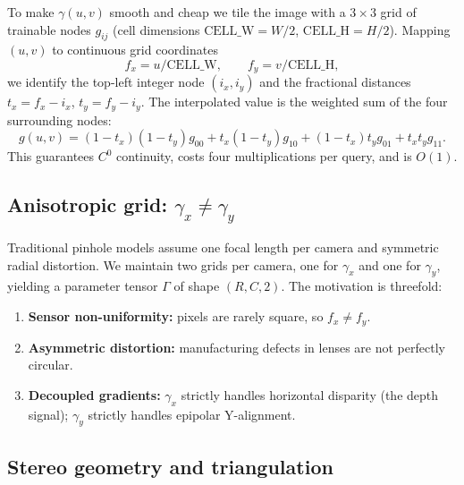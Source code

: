 \documentclass[11pt]{article}
\begin{document}
To make $\gamma(u, v)$ smooth and cheap we tile the image with a $3 \times 3$ grid of
trainable nodes $g_{ij}$ (cell dimensions $\text{CELL\_W} = W/2$, $\text{CELL\_H} = H/2$).
Mapping $(u, v)$ to continuous grid coordinates
\begin{equation}
f_x = u / \text{CELL\_W}, \qquad f_y = v / \text{CELL\_H},
\end{equation}
we identify the top-left integer node $(i_x, i_y)$ and the fractional distances $t_x =
f_x - i_x$, $t_y = f_y - i_y$. The interpolated value is the weighted sum of the four
surrounding nodes:
\begin{equation}
g(u, v) = (1 - t_x)(1 - t_y) g_{00} + t_x (1 - t_y) g_{10} + (1 - t_x) t_y g_{01} + t_x t_y g_{11}.
\label{eq:bilinear}
\end{equation}
This guarantees $C^0$ continuity, costs four multiplications per query, and is $O(1)$.

\subsection{Anisotropic grid: $\gamma_x \neq \gamma_y$}

Traditional pinhole models assume one focal length per camera and symmetric radial
distortion. We maintain two grids per camera, one for $\gamma_x$ and one for $\gamma_y$,
yielding a parameter tensor $\Gamma$ of shape $(R, C, 2)$. The motivation is threefold:
\begin{enumerate}[leftmargin=2em]
  \item \textbf{Sensor non-uniformity:} pixels are rarely square, so $f_x \neq f_y$.
  \item \textbf{Asymmetric distortion:} manufacturing defects in lenses are not perfectly
        circular.
  \item \textbf{Decoupled gradients:} $\gamma_x$ strictly handles horizontal disparity
        (the depth signal); $\gamma_y$ strictly handles epipolar Y-alignment.
\end{enumerate}

\subsection{Stereo geometry and triangulation}
\end{document}
